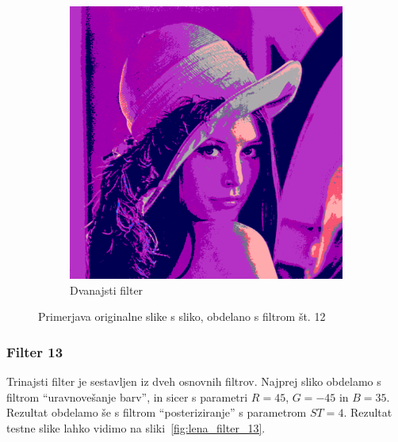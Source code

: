 \documentclass[a4paper, 12pt]{book}
\begin{document}
\begin{figure}[!ht]
\begin{subfigure}[b]{0.4\textwidth}
        \includegraphics[width=\textwidth]{lena_filter_12}
        \caption{Dvanajsti filter}
    \end{subfigure}
    \caption{Primerjava originalne slike s sliko, obdelano s filtrom št. 12}
    \label{fig:lena_filter_12}
\end{figure}


\subsubsection*{Filter 13}
Trinajsti filter je sestavljen iz dveh osnovnih filtrov. Najprej sliko obdelamo s
filtrom ``uravnovešanje barv'', in sicer s parametri $R = 45$, $G = -45$ in
$B = 35$. Rezultat obdelamo še s filtrom ``posteriziranje'' s parametrom
$ST =4$. Rezultat testne slike lahko vidimo na sliki~\ref{fig:lena_filter_13}.
\end{document}

